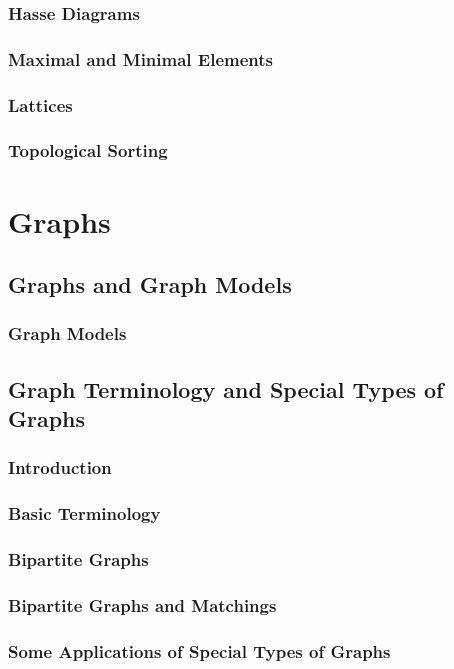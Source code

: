 \documentclass[11pt]{book}
\begin{document}
  \subsection{Hasse Diagrams}
  \subsection{Maximal and Minimal Elements}
  \subsection{Lattices}
  \subsection{Topological Sorting}
 
\chapter{Graphs}
 \section{Graphs and Graph Models}
  \subsection{Graph Models}
  
 \section{Graph Terminology and Special Types of Graphs}
  \subsection{Introduction}
  \subsection{Basic Terminology}
  \subsection{Bipartite Graphs}
  \subsection{Bipartite Graphs and Matchings}
  \subsection{Some Applications of Special Types of Graphs}
\end{document}
